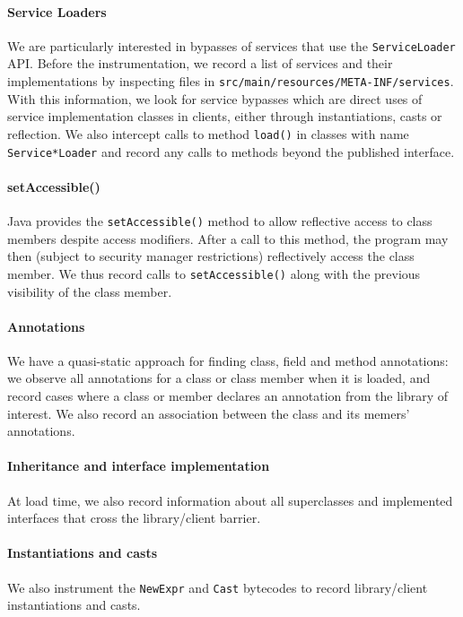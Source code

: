 \paragraph{Service Loaders} We are particularly interested in bypasses of 
services that use the \texttt{ServiceLoader} API. Before the instrumentation, we record a list 
of services and their implementations by inspecting files in \texttt{src/main/resources/META-INF/services}.
With this information, we look for service bypasses which are direct uses of service implementation 
classes in clients, either through instantiations, casts or reflection. We also intercept calls 
to method \texttt{load()} in classes with name \texttt{Service*Loader} and record any calls to methods beyond 
the published interface.

\paragraph{setAccessible()} 
Java provides the \texttt{setAccessible()} method to allow reflective access to class members despite
access modifiers. After a call to this method, the program may then (subject to security manager restrictions)
reflectively access the class member.
We thus record calls to \texttt{setAccessible()} along with the previous visibility of the class member.

\paragraph{Annotations} 
We have a quasi-static approach for finding class, field and method
annotations: we observe all annotations for a class or class member
when it is loaded, and record cases where a class or member declares an
annotation from the library of interest. We also record an association
between the class and its memers' annotations.

\paragraph{Inheritance and interface implementation} At load time,
we also record information about all superclasses and implemented interfaces
that cross the library/client barrier.

\paragraph{Instantiations and casts} We also instrument the
\texttt{NewExpr} and \texttt{Cast} bytecodes to record library/client 
instantiations and casts.

